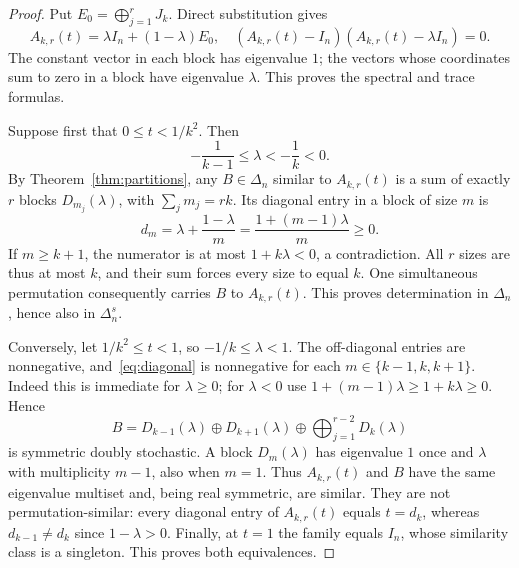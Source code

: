 \documentclass[11pt]{article}
\newcommand{\Del}{\Delta}
\begin{document}
\begin{proof}
Put $E_0=\bigoplus_{j=1}^r J_k$. Direct substitution gives
\begin{equation}\label{eq:affine}
 A_{k,r}(t)=\lambda I_n+(1-\lambda)E_0,
 \quad (A_{k,r}(t)-I_n)(A_{k,r}(t)-\lambda I_n)=0.
\end{equation}
The constant vector in each block has eigenvalue $1$; the vectors whose coordinates sum to zero in a block have eigenvalue $\lambda$. This proves the spectral and trace formulas.

Suppose first that $0\leq t<1/k^2$. Then
\begin{equation}\label{eq:lambdabounds}
 -\frac1{k-1}\leq\lambda<-\frac1k<0.
\end{equation}
By Theorem~\ref{thm:partitions}, any $B\in\Del_n$ similar to $A_{k,r}(t)$ is a sum of exactly $r$ blocks $D_{m_j}(\lambda)$, with $\sum_jm_j=rk$. Its diagonal entry in a block of size $m$ is
\begin{equation}\label{eq:diagonal}
 d_m=\lambda+\frac{1-\lambda}{m}
     =\frac{1+(m-1)\lambda}{m}\geq0.
\end{equation}
If $m\geq k+1$, the numerator is at most $1+k\lambda<0$, a contradiction. All $r$ sizes are thus at most $k$, and their sum forces every size to equal $k$.
One simultaneous permutation consequently carries $B$ to $A_{k,r}(t)$. This proves determination in $\Del_n$, hence also in $\Del_n^s$.

Conversely, let $1/k^2\leq t<1$, so $-1/k\leq\lambda<1$.
The off-diagonal entries are nonnegative, and~\eqref{eq:diagonal} is nonnegative for each $m\in\{k-1,k,k+1\}$. Indeed this is immediate for $\lambda\geq0$; for $\lambda<0$ use $1+(m-1)\lambda\geq1+k\lambda\geq0$.
Hence
\begin{equation}\label{eq:mate}
 B=D_{k-1}(\lambda)\oplus D_{k+1}(\lambda)
       \oplus\bigoplus_{j=1}^{r-2}D_k(\lambda)
\end{equation}
is symmetric doubly stochastic. A block $D_m(\lambda)$ has eigenvalue $1$ once and $\lambda$ with multiplicity $m-1$, also when $m=1$.
Thus $A_{k,r}(t)$ and $B$ have the same eigenvalue multiset and, being real symmetric, are similar. They are not permutation-similar: every diagonal entry of $A_{k,r}(t)$ equals $t=d_k$, whereas $d_{k-1}\ne d_k$ since $1-\lambda>0$.
Finally, at $t=1$ the family equals $I_n$, whose similarity class is a singleton. This proves both equivalences.
\end{proof}
\end{document}
